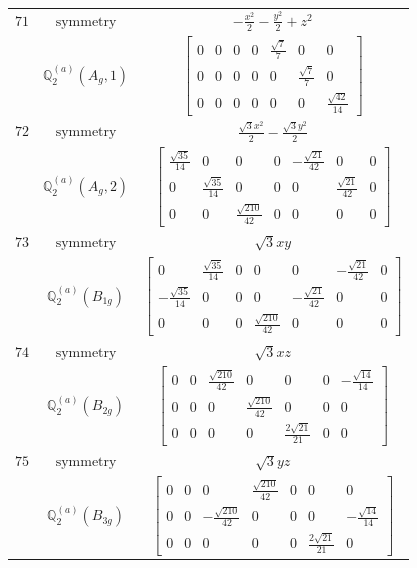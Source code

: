 \documentclass[fleqn,8pt,landscape]{jsarticle}
\begin{document}
\begin{longtable}{ccc}
$ 71 $ & $ \text{symmetry} $ & $ - \frac{x^{2}}{2} - \frac{y^{2}}{2} + z^{2} $ \\
$  $ & $ \mathbb{Q}_{2}^{(a)}(A_{g},1) $ & $ \begin{bmatrix} 0 & 0 & 0 & 0 & \frac{\sqrt{7}}{7} & 0 & 0 \\ 0 & 0 & 0 & 0 & 0 & \frac{\sqrt{7}}{7} & 0 \\ 0 & 0 & 0 & 0 & 0 & 0 & \frac{\sqrt{42}}{14} \end{bmatrix} $ \\ \hline
$ 72 $ & $ \text{symmetry} $ & $ \frac{\sqrt{3} x^{2}}{2} - \frac{\sqrt{3} y^{2}}{2} $ \\
$  $ & $ \mathbb{Q}_{2}^{(a)}(A_{g},2) $ & $ \begin{bmatrix} \frac{\sqrt{35}}{14} & 0 & 0 & 0 & - \frac{\sqrt{21}}{42} & 0 & 0 \\ 0 & \frac{\sqrt{35}}{14} & 0 & 0 & 0 & \frac{\sqrt{21}}{42} & 0 \\ 0 & 0 & \frac{\sqrt{210}}{42} & 0 & 0 & 0 & 0 \end{bmatrix} $ \\ \hline
$ 73 $ & $ \text{symmetry} $ & $ \sqrt{3} x y $ \\
$  $ & $ \mathbb{Q}_{2}^{(a)}(B_{1g}) $ & $ \begin{bmatrix} 0 & \frac{\sqrt{35}}{14} & 0 & 0 & 0 & - \frac{\sqrt{21}}{42} & 0 \\ - \frac{\sqrt{35}}{14} & 0 & 0 & 0 & - \frac{\sqrt{21}}{42} & 0 & 0 \\ 0 & 0 & 0 & \frac{\sqrt{210}}{42} & 0 & 0 & 0 \end{bmatrix} $ \\ \hline
$ 74 $ & $ \text{symmetry} $ & $ \sqrt{3} x z $ \\
$  $ & $ \mathbb{Q}_{2}^{(a)}(B_{2g}) $ & $ \begin{bmatrix} 0 & 0 & \frac{\sqrt{210}}{42} & 0 & 0 & 0 & - \frac{\sqrt{14}}{14} \\ 0 & 0 & 0 & \frac{\sqrt{210}}{42} & 0 & 0 & 0 \\ 0 & 0 & 0 & 0 & \frac{2 \sqrt{21}}{21} & 0 & 0 \end{bmatrix} $ \\ \hline
$ 75 $ & $ \text{symmetry} $ & $ \sqrt{3} y z $ \\
$  $ & $ \mathbb{Q}_{2}^{(a)}(B_{3g}) $ & $ \begin{bmatrix} 0 & 0 & 0 & \frac{\sqrt{210}}{42} & 0 & 0 & 0 \\ 0 & 0 & - \frac{\sqrt{210}}{42} & 0 & 0 & 0 & - \frac{\sqrt{14}}{14} \\ 0 & 0 & 0 & 0 & 0 & \frac{2 \sqrt{21}}{21} & 0 \end{bmatrix} $ \\ \hline

\end{longtable}
\end{document}
